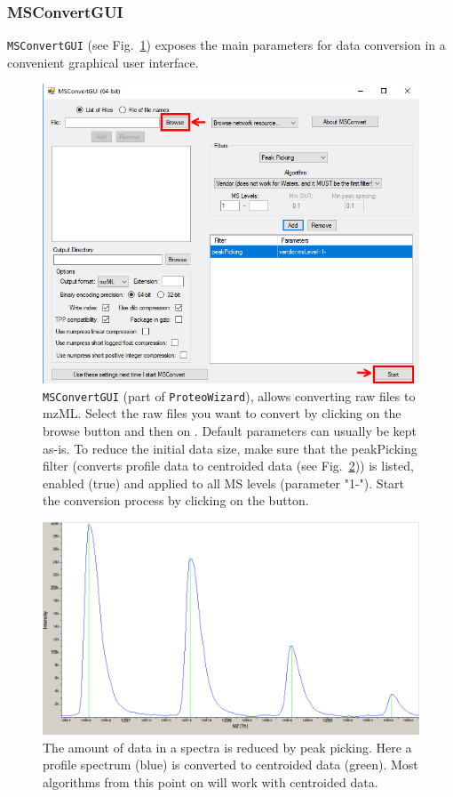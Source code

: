 \subsubsection{MSConvertGUI}
\texttt{MSConvertGUI} (see Fig.~\ref{fig:MSConvertGUI}) exposes the main parameters for data conversion in a convenient graphical user interface.

\begin{figure}
\centering
\includegraphics[width=12cm]{graphics/introduction/proteowizard.png}
\caption{\texttt{MSConvertGUI} (part of \texttt{ProteoWizard}), allows converting raw files to mzML. Select the raw files you want to convert by clicking on the browse button and then on . Default parameters can usually be kept as-is. To reduce the initial data size, make sure that the peakPicking filter (converts profile data to centroided data (see Fig.~\ref{fig:ProfileCentroidData})) is listed, enabled (true) and applied to all MS levels (parameter "1-"). Start the conversion process by clicking on the  button.}
\label{fig:MSConvertGUI}
\end{figure}

\begin{figure}
\centering
\includegraphics[width=12cm]{graphics/introduction/profilecentroided.png}
\caption{The amount of data in a spectra is reduced by peak picking. Here a profile spectrum (blue) is converted to centroided data (green). Most algorithms  from this point on will work with centroided data.}
\label{fig:ProfileCentroidData}
\end{figure}

